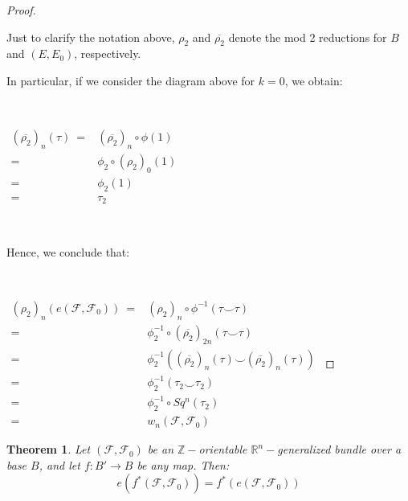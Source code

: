\documentclass[12pt,oneside]{book}
\newtheorem{teo}    {Theorem}[chapter]
\newcommand{\R}{\mathbb{R}}
\newcommand{\Z}{\mathbb{Z}}
\newcommand{\ccup}{\smile}
\begin{document}
\begin{proof}
        \

        Just to clarify the notation above, $\rho_{2}$ and $\overline{\rho_{2}}$ denote the mod 2 reductions for $B$ and $(E,E_{0})$, 
        respectively.

        In particular, if we consider the diagram above for $k=0$, we obtain:

        \

        $ \begin{array}{rl}
        	(\overline{\rho_{2}})_{n}(\tau) \ = & (\overline{\rho_{2}})_{n}\circ\phi(1) \\
        	= & \phi_{2}\circ (\rho_{2})_{0}(1) \\
        	= & \phi_{2}(1) \\
        	= & \tau_{2}
        \end{array} $

        \

        Hence, we conclude that:

        \

        $ \begin{array}{rl}
        	(\rho_{2})_{n}(e(\mathcal{F},\mathcal{F}_{0})) \ = & (\rho_{2})_{n}\circ \phi^{-1}(\tau\ccup \tau) \\
        	= & \phi_{2}^{-1}\circ (\overline{\rho_{2}})_{2n}(\tau\ccup \tau) \\
        	= & \phi_{2}^{-1}((\overline{\rho_{2}})_{n}(\tau)\ccup (\overline{\rho_{2}})_{n}(\tau)) \\
        	= & \phi_{2}^{-1}(\tau_{2}\ccup \tau_{2}) \\
        	= & \phi_{2}^{-1}\circ Sq^{n}(\tau_{2}) \\
        	= & w_{n}(\mathcal{F},\mathcal{F}_{0})
        \end{array} $

    \end{proof}

    \begin{teo}\label{euler_pullback}
	Let $(\mathcal{F},\mathcal{F}_{0})$ be an $\Z-$orientable $\R^{n}-$generalized bundle over a base $B$, 
    and let $f:B'\to B$ be any map. Then:
	$$ e\left( f^{*}(\mathcal{F},\mathcal{F}_{0}) \right)=f^{*}\left( e(\mathcal{F},\mathcal{F}_{0}) \right) $$
    \end{teo}
\end{document}

